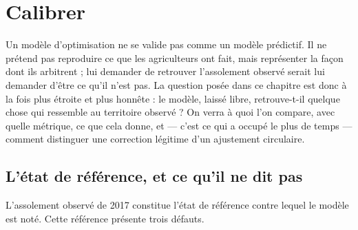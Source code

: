 \chapter{Calibrer}
\label{ch:calibrer}
%


Un modèle d'optimisation ne se valide pas comme un modèle prédictif. Il ne prétend pas
reproduire ce que les agriculteurs ont fait, mais représenter la façon dont ils
arbitrent ; lui demander de retrouver l'assolement observé serait lui demander d'être ce qu'il
n'est pas. La question posée dans ce chapitre est donc à la fois plus étroite et plus honnête :
le modèle, laissé libre, retrouve-t-il quelque chose qui ressemble au territoire
observé ? On verra à quoi l'on compare, avec quelle métrique, ce que cela donne, et — c'est ce
qui a occupé le plus de temps — comment distinguer une correction légitime d'un
ajustement circulaire.

\section{L'état de référence, et ce qu'il ne dit pas}
\label{sec:reference}

L'assolement observé de 2017 constitue l'état de référence contre lequel le modèle est noté.
Cette référence présente trois défauts.

